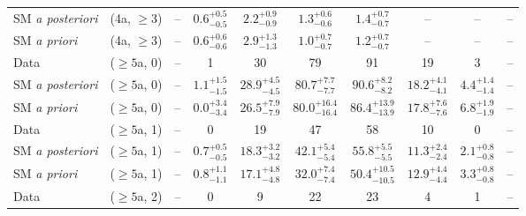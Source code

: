 \begin{table}[h!]
{\begin{tabular}{lccccccccc}
	SM {\it a posteriori} & (4a, $\ge3$)      & --                             & $0.6^{+ 0.5 }_{- 0.5 }$        & $2.2^{+ 0.9 }_{- 0.9 }$     & $1.3^{+ 0.6 }_{- 0.6 }$     & $1.4^{+ 0.7 }_{- 0.7 }$     & --                       & --                       & --           \\[0.5ex] 
	SM {\it a priori}     & (4a, $\ge3$)      & --                             & $0.6^{+ 0.6 }_{- 0.6 }$        & $2.9^{+ 1.3 }_{- 1.3 }$     & $1.0^{+ 0.7 }_{- 0.7 }$     & $1.2^{+ 0.7 }_{- 0.7 }$     & --                       & --                       & --           \\[0.5ex] 
	Data                  & ($\ge5$a, 0)      & --                             & 1                              & 30                          & 79                          & 91                          & 19                       & 3                        & --           \\[0.5ex] 
	SM {\it a posteriori} & ($\ge5$a, 0)      & --                             & $1.1^{+ 1.5 }_{- 1.5 }$        & $28.9^{+ 4.5 }_{- 4.5 }$    & $80.7^{+ 7.7 }_{- 7.7 }$    & $90.6^{+ 8.2 }_{- 8.2 }$    & $18.2^{+ 4.1 }_{- 4.1 }$ & $4.4^{+ 1.4 }_{- 1.4 }$  & --           \\[0.5ex] 
	SM {\it a priori}     & ($\ge5$a, 0)      & --                             & $0.0^{+ 3.4 }_{- 3.4 }$        & $26.5^{+ 7.9 }_{- 7.9 }$    & $80.0^{+ 16.4 }_{- 16.4 }$  & $86.4^{+ 13.9 }_{- 13.9 }$  & $17.8^{+ 7.6 }_{- 7.6 }$ & $6.8^{+ 1.9 }_{- 1.9 }$  & --           \\[0.5ex] 
	Data                  & ($\ge5$a, 1)      & --                             & 0                              & 19                          & 47                          & 58                          & 10                       & 0                        & --           \\[0.5ex] 
	SM {\it a posteriori} & ($\ge5$a, 1)      & --                             & $0.7^{+ 0.5 }_{- 0.5 }$        & $18.3^{+ 3.2 }_{- 3.2 }$    & $42.1^{+ 5.4 }_{- 5.4 }$    & $55.8^{+ 5.5 }_{- 5.5 }$    & $11.3^{+ 2.4 }_{- 2.4 }$ & $2.1^{+ 0.8 }_{- 0.8 }$  & --           \\[0.5ex] 
	SM {\it a priori}     & ($\ge5$a, 1)      & --                             & $0.8^{+ 1.1 }_{- 1.1 }$        & $17.1^{+ 4.8 }_{- 4.8 }$    & $32.0^{+ 7.4 }_{- 7.4 }$    & $50.4^{+ 10.5 }_{- 10.5 }$  & $12.9^{+ 4.4 }_{- 4.4 }$ & $3.3^{+ 0.8 }_{- 0.8 }$  & --           \\[0.5ex] 
	Data                  & ($\ge5$a, 2)      & --                             & 0                              & 9                           & 22                          & 23                          & 4                        & 1                        & --           \\[0.5ex] 

\end{tabular}}
\end{table}
